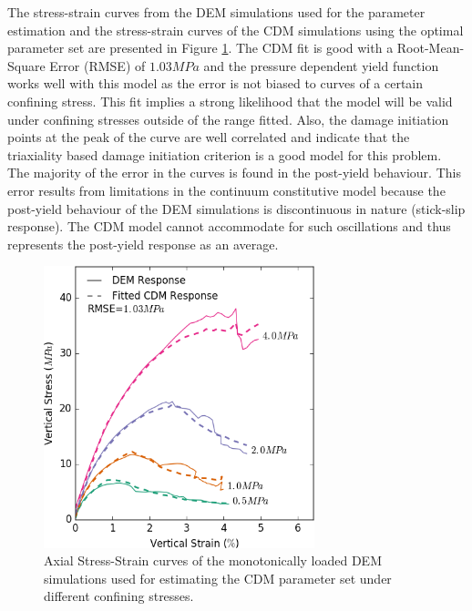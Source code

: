 The stress-strain curves from the DEM simulations used for the parameter estimation and the stress-strain curves of the CDM simulations using the optimal parameter set are presented in Figure \ref{fig:fitted1}. The CDM fit is good with a Root-Mean-Square Error (RMSE) of $1.03MPa$ and the pressure dependent yield function works well with this model as the error is not biased to curves of a certain confining stress. This fit implies a strong likelihood that the model will be valid under confining stresses outside of the range fitted. Also, the damage initiation points at the peak of the curve are well correlated and indicate that the triaxiality based damage initiation criterion is a good model for this problem. The majority of the error in the curves is found in the post-yield behaviour. This error results from limitations in the continuum constitutive model because the post-yield behaviour of the DEM simulations is discontinuous in nature (stick-slip response). The CDM model cannot accommodate for such oscillations and thus represents the post-yield response as an average. 


\begin{figure}[!htb]
\begin{center}
\includegraphics[width=0.7\textwidth]{figures/druckerDamage_voronoiGranite/voronoiGranite_druckerDamage_lastFrame_dir-2}
\caption{{\label{fig:fitted1} Axial Stress-Strain curves of the monotonically loaded DEM simulations used for estimating the CDM parameter set under different confining stresses.%
}}
\end{center}
\end{figure}

